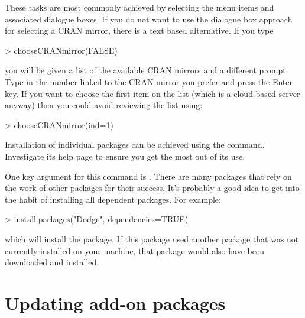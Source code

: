 These tasks are most commonly achieved by selecting the menu items and associated dialogue boxes. If you do not want to use the dialogue box approach for selecting a CRAN mirror, there is a text based alternative. If you type

\begin{Schunk}
\begin{Sinput}
> chooseCRANmirror(FALSE)
\end{Sinput}
\end{Schunk}

you will be given a list of the available CRAN mirrors and a different prompt. Type in the number linked to the CRAN mirror you prefer and press the Enter key. If you want to choose the first item on the list (which is a cloud-based server anyway) then you could avoid reviewing the list using:

\begin{Schunk}
\begin{Sinput}
> chooseCRANmirror(ind=1)
\end{Sinput}
\end{Schunk}


Installation of individual packages can be achieved using the  command. Investigate its help page to ensure you get the most out of its use. 

One key argument for this command is . There are many packages that rely on the work of other packages for their success. It's probably a good idea to get into the habit of installing all dependent packages. For example:

\begin{Schunk}
\begin{Sinput}
> install.packages("Dodge", dependencies=TRUE)
\end{Sinput}
\end{Schunk}

which will install the  package. If this package used another package that was not currently installed on your machine, that package would also have been downloaded and installed.

\section{Updating add-on packages}

